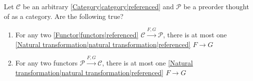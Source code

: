 
Let $\mathcal{C}$ be an arbitrary \ref{Category|category|referenced} and $\mathcal{P}$ be a preorder thought of as a category. Are the following true?
    \begin{enumerate}
      \item For any two \ref{Functor|functors|referenced} $\mathcal{C}\xrightarrow{F,G}\mathcal{P}$, there is at most one \ref{Natural transformation|natural transformation|referenced} $F \rightarrow G$
      \item  For any two functors $\mathcal{P}\xrightarrow{F,G}\mathcal{C}$, there is at most one \ref{Natural transformation|natural transformation|referenced} $F \rightarrow G$
    \end{enumerate}
